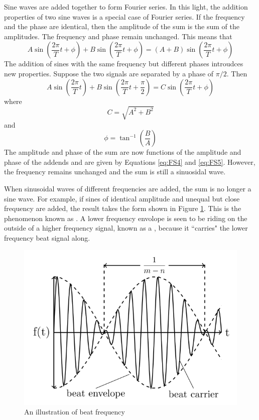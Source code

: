\noindent Sine waves are added together to form Fourier series. In this light, the addition properties of two sine waves is a special case of Fourier series. If the frequency and the phase are identical, then the amplitude of the sum is the sum of the amplitudes. The frequency and phase remain unchanged. This means that \begin{equation}\label{eq:FS2}
    A\sin\left(\frac{2\pi}{T}t+\phi\right) + B\sin\left(\frac{2\pi}{T}t+\phi\right) = (A+B)\sin\left(\frac{2\pi}{T}t+\phi\right)
\end{equation}
The addition of sines with the same frequency but different phases introudces new properties. Suppose the two signals are separated by a phase of $\pi/2$. Then \begin{equation}\label{eq:FS3}
    A\sin\left(\frac{2\pi}{T}t\right) + B\sin\left(\frac{2\pi}{T}t+\frac{\pi}{2}\right) = C\sin\left(\frac{2\pi}{T}t+\phi\right)
\end{equation}
where \begin{equation}\label{eq:FS4}
    C = \sqrt{A^2+B^2}
\end{equation}
and \begin{equation}\label{eq:FS5}
    \phi = \tan^{-1}\left(\frac{B}{A}\right)
\end{equation}
The amplitude and phase of the sum are now functions of the amplitude and phase of the addends and are given by Equations \ref{eq:FS4} and \ref{eq:FS5}. However, the frequency remains unchanged and the sum is still a sinuosidal wave.

\noindent When sinusoidal waves of different frequencies are added, the sum is no longer a sine wave. For example, if sines of identical amplitude and unequal but close frequency are added, the result takes the form shown in Figure \ref{fig:FS3}. This is the phenomenon known as . A lower frequency envolope is seen to be riding on the outside of a higher frequency signal, known as a , because it ``carries" the lower frequency beat signal along.

\begin{figure}[H]
    \centering
    \includegraphics[scale = 0.8]{Images/FS3.PNG}
    \caption{An illustration of beat frequency}
    \label{fig:FS3}
\end{figure}

